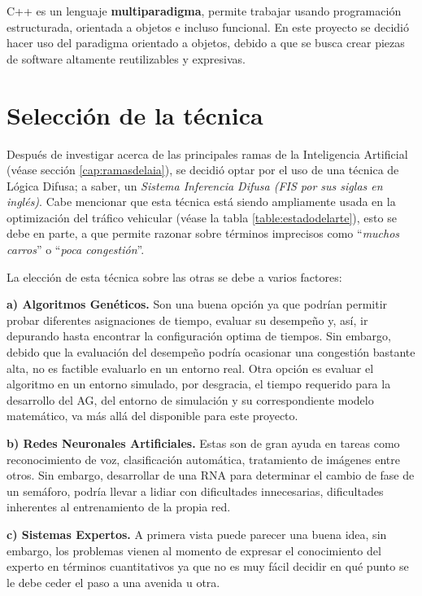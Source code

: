 C++ es un lenguaje \textbf{multiparadigma}, permite trabajar usando programación estructurada, orientada a objetos e incluso funcional. En este proyecto se decidió hacer uso del paradigma orientado a objetos, debido a que se busca crear piezas de software altamente reutilizables y expresivas.

\section{Selección de la técnica}\label{section:selecciontecnica}
Después de investigar acerca de las principales ramas de la Inteligencia Artificial (véase sección \ref{cap:ramasdelaia}), se decidió optar por el uso de una técnica de Lógica Difusa; a saber, un \emph{Sistema Inferencia Difusa (FIS por sus siglas en inglés)}. Cabe mencionar que esta técnica está siendo ampliamente usada en la optimización del tráfico vehicular (véase la tabla \ref{table:estadodelarte}), esto se debe en parte, a que permite razonar sobre términos imprecisos como ``\emph{muchos carros}'' o ``\emph{poca congestión}''.

La elección de esta técnica sobre las otras se debe a varios factores: 

\textbf{a) Algoritmos Genéticos.} Son una buena opción ya que podrían permitir probar diferentes asignaciones de tiempo, evaluar su desempeño y, así, ir depurando hasta encontrar la configuración optima de tiempos. Sin embargo, debido que la evaluación del desempeño podría ocasionar una congestión bastante alta, no es factible evaluarlo en un entorno real. Otra opción es evaluar el algoritmo en un entorno simulado, por desgracia, el tiempo requerido para la desarrollo del AG, del entorno de simulación y su correspondiente modelo matemático, va más allá del disponible para este proyecto.

\textbf{b) Redes Neuronales Artificiales.} Estas son de gran ayuda en tareas como reconocimiento de voz, clasificación automática, tratamiento de imágenes entre otros. Sin embargo, desarrollar de una RNA para determinar el cambio de fase de un semáforo, podría llevar a lidiar con dificultades innecesarias, dificultades inherentes al entrenamiento de la propia red.

\textbf{c) Sistemas Expertos.} A primera vista puede parecer una buena idea, sin embargo, los problemas vienen al momento de expresar el conocimiento del experto en términos cuantitativos ya que no es muy fácil decidir en qué punto se le debe ceder el paso a una avenida u otra.

